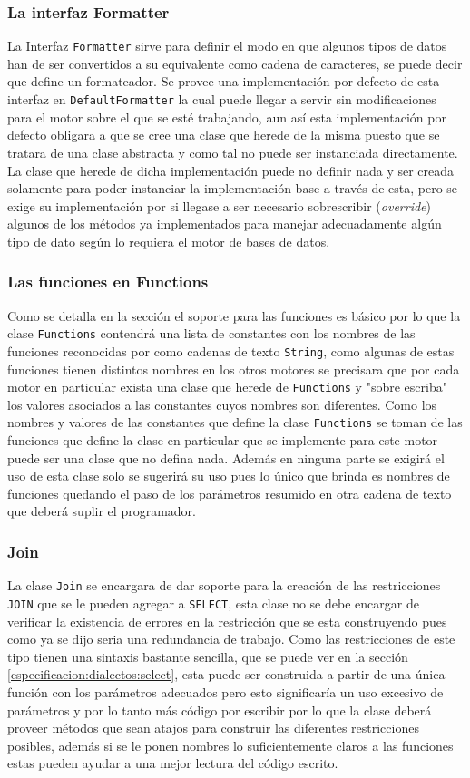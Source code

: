 \subsubsection{La interfaz Formatter}
La Interfaz \verb=Formatter= sirve para definir el modo en que algunos tipos de datos han de ser convertidos a su equivalente como cadena de caracteres, se puede decir que define un formateador. Se provee una implementación por defecto de esta interfaz en \verb=DefaultFormatter= la cual puede llegar a servir sin modificaciones para el motor sobre el que se esté trabajando, aun así esta implementación por defecto obligara a que se cree una clase que herede de la misma puesto que se tratara de una clase abstracta y como tal no puede ser instanciada directamente. La clase que herede de dicha implementación puede no definir nada y ser creada solamente para poder instanciar la implementación base a través de esta, pero se exige su implementación por si llegase a ser necesario sobrescribir (\textit{override}) algunos de los métodos ya implementados para manejar adecuadamente algún tipo de dato según lo requiera el motor de bases de datos.
%
\subsubsection{Las funciones  en Functions}
Como se detalla en la sección  el soporte para las funciones es básico por lo que la clase \verb=Functions= contendrá una lista de constantes con los nombres de las funciones reconocidas por \jj como cadenas de texto \verb=String=, como algunas de estas funciones tienen distintos nombres en los otros motores se precisara que por cada motor en particular exista una clase que herede de \verb=Functions= y "sobre escriba" los valores asociados a las constantes cuyos nombres son diferentes. Como los nombres y valores de las constantes que define la clase \verb=Functions= se toman de las funciones que define \s la clase en particular que se implemente para este motor puede ser una clase que no defina nada. Además en ninguna parte se exigirá el uso de esta clase solo se sugerirá su uso pues lo único que brinda es nombres de funciones quedando el paso de los parámetros resumido en otra cadena de texto que deberá suplir el programador.  
%
\subsubsection{Join}
La clase \verb=Join= se encargara de dar soporte para la creación de las restricciones \verb=JOIN= que se le pueden agregar a \verb=SELECT=, esta clase no se debe encargar de verificar la existencia de errores en la restricción que se esta construyendo pues como ya se dijo seria una redundancia de trabajo. Como las restricciones de este tipo tienen una sintaxis bastante sencilla, que se puede ver en la sección \ref{especificacion:dialectos:select}, esta puede ser construida a partir de una única función con los parámetros adecuados pero esto significaría un uso excesivo de parámetros y por lo tanto más código por escribir por lo que la clase deberá proveer métodos que sean atajos para construir las diferentes restricciones posibles, además si se le ponen nombres lo suficientemente claros a las funciones estas pueden ayudar a una mejor lectura del código escrito.
%
